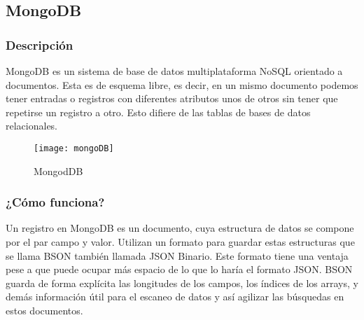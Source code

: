 


\subsection{MongoDB}

\subsubsection{ Descripción }

MongoDB \cite{URL::MongoDB} es un sistema de base de datos multiplataforma NoSQL  \cite{URL::NoSQL} orientado a documentos. Esta es de esquema libre, es decir, en un mismo documento podemos tener entradas o registros con diferentes atributos unos de otros sin tener que repetirse un registro a otro. Esto difiere de las tablas de bases de datos relacionales.

	
\begin{figure}[h]
	\centering
	\texttt{[image: mongoDB]}
	\caption{ MongodDB }
	\label{fig:mongoDB}
\end{figure}

\subsubsection{ ¿Cómo funciona? }

Un registro en MongoDB es un documento, cuya estructura de datos se compone por el par campo y valor. Utilizan un formato para guardar estas estructuras que se llama BSON \cite{URL::BSON} también llamada JSON Binario. Este formato tiene una ventaja pese a que puede ocupar más espacio de lo que lo haría el formato JSON. BSON guarda de forma explícita las longitudes de los campos, los índices de los arrays, y demás información útil para el escaneo de datos y así agilizar las búsquedas en estos documentos.

